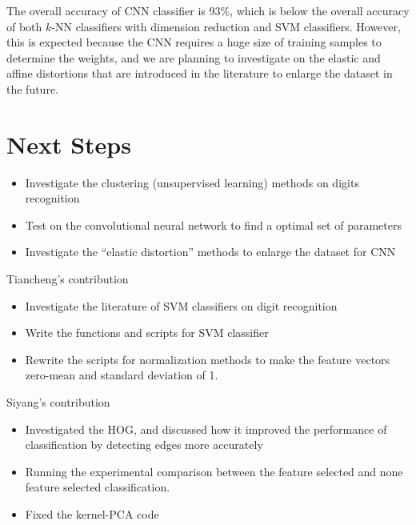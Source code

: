 \documentclass[12pt]{article}
\newenvironment{nscenter}
 {\parskip=0pt\par\nopagebreak\centering}
 {\par\noindent\ignorespacesafterend}
\begin{document}
The overall accuracy of CNN classifier is 93\%, which is below the overall accuracy of both $k$-NN classifiers with dimension reduction and SVM classifiers. However, this is expected because the CNN requires a huge size of training samples to determine the weights, and we are planning to investigate on the elastic and affine distortions that are introduced in the literature \cite{cirecsan2011convolutional, ciresan2012multi} to enlarge the dataset in the future.

\section{Next Steps}
\begin{itemize}
	\item Investigate the clustering (unsupervised learning) methods on digits recognition
	\item Test on the convolutional neural network to find a optimal set of parameters
	\item Investigate the ``elastic distortion'' methods to enlarge the dataset for CNN
\end{itemize}





\newpage
\begin{nscenter}
\Large{Tiancheng's contribution}
\end{nscenter}
\begin{itemize}
\item Investigate the literature of SVM classifiers on digit recognition
\item Write the functions and scripts for SVM classifier
\item Rewrite the scripts for normalization methods to make the feature vectors zero-mean and standard deviation of 1.
\end{itemize}

\newpage
\begin{nscenter}
\Large{Siyang's contribution}
\end{nscenter}
\begin{itemize}
\item Investigated the HOG, and discussed how it improved the performance of classification by detecting edges more accurately
\item Running the experimental comparison between the feature selected and none feature selected classification.
\item Fixed the kernel-PCA code
\end{itemize}



\end{document}
